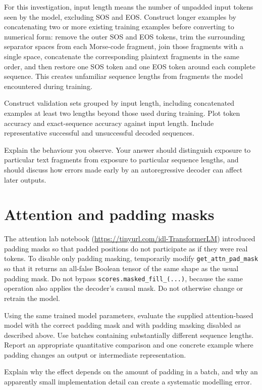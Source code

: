 \documentclass[a4paper]{article}
\begin{document}
For this investigation, input length means the number of unpadded input tokens seen by the model, excluding SOS and EOS. Construct longer examples by concatenating two or more existing training examples before converting to numerical form: remove the outer SOS and EOS tokens, trim the surrounding separator spaces from each Morse-code fragment, join those fragments with a single space, concatenate the corresponding plaintext fragments in the same order, and then restore one SOS token and one EOS token around each complete sequence. This creates unfamiliar sequence lengths from fragments the model encountered during training.

\begin{tcolorbox}[parbox=false,title=2.1 Test length generalisation (3 marks)]
Construct validation sets grouped by input length, including concatenated examples at least two lengths beyond those used during training. Plot token accuracy and exact-sequence accuracy against input length. Include representative successful and unsuccessful decoded sequences.

Explain the behaviour you observe. Your answer should distinguish exposure to particular text fragments from exposure to particular sequence lengths, and should discuss how errors made early by an autoregressive decoder can affect later outputs.
\end{tcolorbox}

\section{Attention and padding masks}

The attention lab notebook (\url{https://tinyurl.com/idl-TransformerLM}) introduced padding masks so that padded positions do not participate as if they were real tokens. To disable only padding masking, temporarily modify \texttt{get\_attn\_pad\_mask} so that it returns an all-false Boolean tensor of the same shape as the usual padding mask. Do not bypass \texttt{scores.masked\_fill\_(...)}, because the same operation also applies the decoder's causal mask. Do not otherwise change or retrain the model.

\begin{tcolorbox}[parbox=false,title=3.1 Investigate the effect of masking (2 marks)]
Using the same trained model parameters, evaluate the supplied attention-based model with the correct padding mask and with padding masking disabled as described above. Use batches containing substantially different sequence lengths. Report an appropriate quantitative comparison and one concrete example where padding changes an output or intermediate representation.

Explain why the effect depends on the amount of padding in a batch, and why an apparently small implementation detail can create a systematic modelling error.
\end{tcolorbox}
\end{document}

